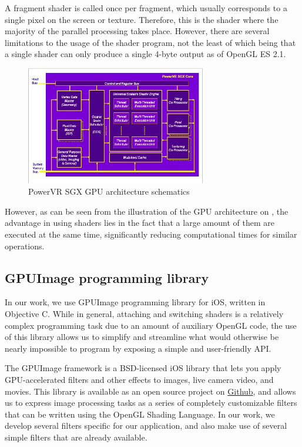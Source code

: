 A fragment shader is called once per fragment, which usually corresponds to a single pixel on the screen or texture. Therefore, this is the shader where the majority of the parallel processing takes place. However, there are several limitations to the usage of the shader program, not the least of which being that a single shader can only produce a single 4-byte output  as of OpenGL ES 2.1. 

\begin{figure}[t]
		\centering
		\includegraphics[width=0.7\textwidth]{GPUScheme}
		\caption{PowerVR SGX GPU architecture schematics}
		\label{gpu}
	\end{figure}
However, as can be seen from the illustration of the GPU architecture on  , the advantage in using shaders lies in the fact that a large amount of them are executed at the same time, significantly reducing computational times for similar operations. 
\subsection{GPUImage programming library}
In our work, we use GPUImage programming library for iOS, written in Objective C. While in general, attaching and switching shaders is a relatively complex programming task due to an amount of auxiliary OpenGL code, the use of this library allows us to simplify and  streamline what would otherwise be nearly impossible to program by exposing a simple and user-friendly API. 

 The GPUImage framework is a BSD-licensed iOS library that lets you apply GPU-accelerated filters and other effects to images, live camera video, and movies. This library is available as an open source project on \href{https://github.com/BradLarson/GPUImage}{Github}, and allows us to express image processing tasks as a series of completely customizable filters that can be written using the OpenGL Shading Language. In our work, we develop several filters specific for our application, and also make use of several simple filters that are already available.

